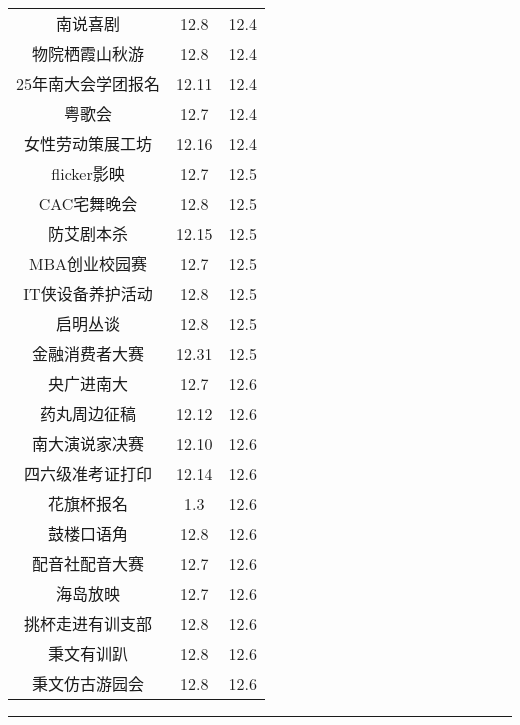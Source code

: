 \documentclass[letterpaper, 12pt]{article}
\begin{document}
\begin{multicols}{2}
{\begin{longtable}{|c|c|c|}
    南说喜剧 & 12.8 & 12.4\\
    物院栖霞山秋游 & 12.8 & 12.4\\
    25年南大会学团报名 & 12.11 & 12.4\\
    粤歌会 & 12.7 & 12.4\\
    女性劳动策展工坊 & 12.16 & 12.4\\
    flicker影映 & 12.7 & 12.5\\
    CAC宅舞晚会 & 12.8 & 12.5\\
    防艾剧本杀 & 12.15 & 12.5\\
    MBA创业校园赛 & 12.7 & 12.5\\
    IT侠设备养护活动 & 12.8 & 12.5\\
    启明丛谈 & 12.8 & 12.5\\
    金融消费者大赛 & 12.31 & 12.5\\
    央广进南大 & 12.7 & 12.6\\
    药丸周边征稿 & 12.12 & 12.6\\
    南大演说家决赛 & 12.10 & 12.6\\
    四六级准考证打印 & 12.14 & 12.6\\
    花旗杯报名 & 1.3 & 12.6\\
    鼓楼口语角 & 12.8 & 12.6\\
    配音社配音大赛 & 12.7 & 12.6\\
    海岛放映 & 12.7 & 12.6\\
    挑杯走进有训支部 & 12.8 & 12.6\\
    秉文有训趴 & 12.8 & 12.6\\
    秉文仿古游园会 & 12.8 & 12.6\\
    \hline
\end{longtable}
\unskip
\unpenalty
\unpenalty}\unvbox\colbbox
\end{multicols}
\hrule
\pagebreak
\end{document}
